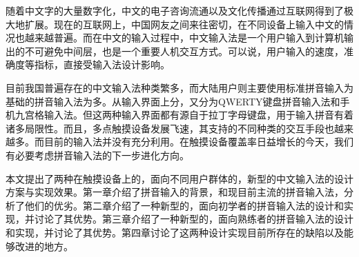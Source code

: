 
  随着中文字的大量数字化，中文的电子咨询流通以及文化传播通过互联网得到了极大地扩展。现在的互联网上，中国网友之间来往密切，在不同设备上输入中文的情况也越来越普遍。而在中文的输入过程中，中文输入法是一个用户输入到计算机输出的不可避免中间层，也是一个重要人机交互方式。可以说，用户输入的速度，准确度等指标，直接受输入法设计影响。

  目前我国普遍存在的中文输入法种类繁多，而大陆用户则主要使用标准拼音输入为基础的拼音输入法为多。从输入界面上分，又分为QWERTY键盘拼音输入法和手机九宫格输入法。但这两种输入界面都有源自于拉丁字母键盘，用于输入拼音有着诸多局限性。而且，多点触摸设备发展飞速，其支持的不同种类的交互手段也越来越多。而目前的输入法并没有充分利用。在触摸设备覆盖率日益增长的今天，我们有必要考虑拼音输入法的下一步进化方向。

  本文提出了两种在触摸设备上的，面向不同用户群体的，新型的中文输入法的设计方案与实现效果。第一章介绍了拼音输入的背景，和现目前主流的拼音输入法，分析了他们的优劣。第二章介绍了一种新型的，面向初学者的拼音输入法的设计和实现，并讨论了其优势。第三章介绍了一种新型的，面向熟练者的拼音输入法的设计和实现，并讨论了其优势。第四章讨论了这两种设计实现目前所存在的缺陷以及能够改进的地方。
